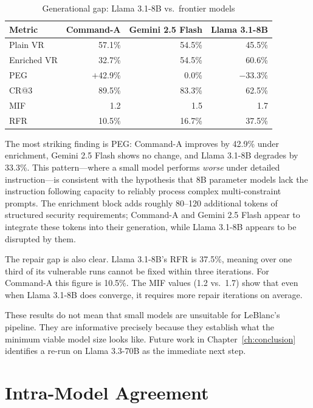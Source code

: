 \documentclass[12pt,a4paper]{report}
\begin{document}
\begin{table}[H]
\centering
\caption{Generational gap: Llama 3.1-8B vs.\ frontier models}
\label{tab:gen}
\renewcommand{\arraystretch}{1.3}
\begin{tabular}{@{}lrrr@{}}
\toprule
\textbf{Metric} & \textbf{Command-A}
                & \textbf{Gemini 2.5 Flash}
                & \textbf{Llama 3.1-8B} \\
\midrule
Plain VR             & 57.1\% & 54.5\% & 45.5\% \\
Enriched VR          & 32.7\% & 54.5\% & 60.6\% \\
PEG                  & $+$42.9\% & 0.0\% & $-$33.3\% \\
CR@3                 & 89.5\% & 83.3\% & 62.5\%  \\
MIF                  & 1.2    & 1.5    & 1.7     \\
RFR                  & 10.5\% & 16.7\% & 37.5\%  \\
\bottomrule
\end{tabular}
\end{table}

The most striking finding is PEG: Command-A improves by 42.9\% under enrichment,
Gemini 2.5 Flash shows no change, and Llama 3.1-8B degrades by 33.3\%. This
pattern---where a small model performs \emph{worse} under detailed instruction---is
consistent with the hypothesis that 8B parameter models lack the instruction
following capacity to reliably process complex multi-constraint prompts. The
enrichment block adds roughly 80--120 additional tokens of structured security
requirements; Command-A and Gemini 2.5 Flash appear to integrate these tokens
into their generation, while Llama 3.1-8B appears to be disrupted by them.

The repair gap is also clear. Llama 3.1-8B's RFR is 37.5\%, meaning over one
third of its vulnerable runs cannot be fixed within three iterations. For
Command-A this figure is 10.5\%. The MIF values (1.2 vs.\ 1.7) show that even
when Llama 3.1-8B does converge, it requires more repair iterations on average.

These results do not mean that small models are unsuitable for LeBlanc's
pipeline. They are informative precisely because they establish what the
minimum viable model size looks like. Future work in Chapter~\ref{ch:conclusion}
identifies a re-run on Llama 3.3-70B as the immediate next step.

\section{Intra-Model Agreement}
\label{sec:intramodel}
\end{document}
